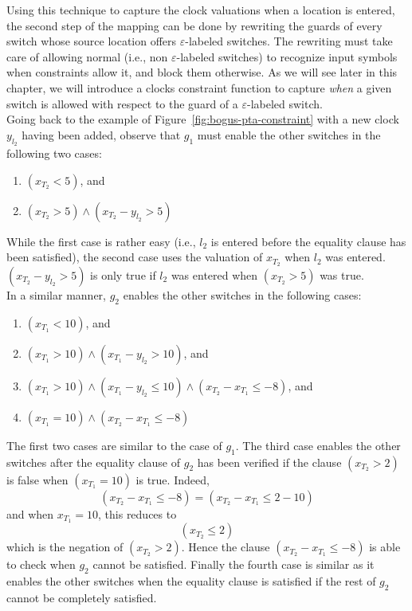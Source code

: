 Using this technique to capture the clock valuations when a location is entered, the second step of the mapping can be done by rewriting the guards of every switch whose source location offers $\varepsilon$-labeled switches. The rewriting must take care of allowing normal (i.e., non $\varepsilon$-labeled switches) to recognize input symbols when \MInvoke constraints allow it, and block them otherwise. As we will see later in this chapter, we will introduce a clocks constraint function to capture \emph{when} a given switch is allowed with respect to the guard of a $\varepsilon$-labeled switch.\\

Going back to the example of Figure~\ref{fig:bogus-pta-constraint} with a new clock $y_{l_2}$ having been added, observe that $g_1$ must enable the other switches in the following two cases:
\begin{enumerate}
  
  \item $(x_{T_2} < 5)$, and
  
  \item $(x_{T_2} > 5) \wedge (x_{T_2} - y_{l_2} > 5)$
  
\end{enumerate}
While the first case is rather easy (i.e., $l_2$ is entered before the equality clause has been satisfied), the second case uses the valuation of $x_{T_2}$ when $l_2$ was entered. $(x_{T_2} - y_{l_2} > 5)$ is only true if $l_2$ was entered when $(x_{T_2} > 5)$ was true.\\

In a similar manner, $g_2$ enables the other switches in the following cases:
\begin{enumerate}
  
  \item $(x_{T_1} < 10)$, and
  
  \item $(x_{T_1} > 10) \wedge (x_{T_1} - y_{l_2} > 10)$, and

  \item $(x_{T_1} > 10) \wedge (x_{T_1} - y_{l_2} \leq 10) \wedge (x_{T_2} - x_{T_1} \leq -8)$, and
  
  \item $(x_{T_1} = 10) \wedge (x_{T_2} - x_{T_1} \leq -8)$
  
\end{enumerate}
The first two cases are similar to the case of $g_1$. The third case enables the other switches after the equality clause of $g_2$ has been verified if the clause $(x_{T_2} > 2)$ is false when $(x_{T_1} = 10)$ is true. Indeed,
$$ (x_{T_2} - x_{T_1} \leq -8) =  (x_{T_2} - x_{T_1} \leq 2 - 10) $$
and when $x_{T_1} = 10$, this reduces to
$$ (x_{T_2} \leq 2) $$
which is the negation of $(x_{T_2} > 2)$. Hence the clause $(x_{T_2} - x_{T_1} \leq -8)$ is able to check when $g_2$ cannot be satisfied. Finally the fourth case is similar as it enables the other switches when the equality clause is satisfied if the rest of $g_2$ cannot be completely satisfied.\\


